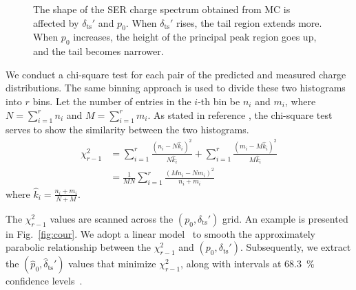 \begin{figure}[!htbp]
\begin{subfigure}{0.47\textwidth}
		\caption{}
		\label{fig:ts}
	\end{subfigure}
	\caption{The shape of the SER charge spectrum obtained from MC is affected by $\delta_{\mathrm{ts}}'$ and $p_0$. When $\delta_{\mathrm{ts}}'$ rises, the tail region extends more. When $p_0$ increases, the height of the principal peak region goes up, and the tail becomes  narrower.
	}
	\label{fig:tsp}
\end{figure}

We conduct a chi-square test for each pair of the predicted and measured charge distributions. The same binning approach is used to divide these two histograms into \(r\) bins. Let the number of entries in the \(i\)-th bin be \(n_i\) and \(m_{i}\), where \(N=\sum_{i = 1}^{r}n_{i}\) and \(M=\sum_{i = 1}^{r}m_{i}\). As stated in reference \cite{2006Comparison}, the chi-square test serves to show the similarity between the two histograms.
\begin{equation}
	\label{eq:chi}
	\begin{aligned}
		\chi^2_{r-1} & =\sum_{{i}=1}^r \frac{\left(n_{i}-N \hat{k}_{i}\right)^2}{N \hat{k}_{i}}+\sum_{{i}=1}^r\frac{\left(m_{i}-M \hat{k}_{i}\right)^2}{M \hat{k}_{i}} \\
		             & =\frac{1}{M N} \sum_{{i}=1}^r\frac{\left(M n_{i}-N m_{i}\right)^2}{n_{i}+m_{i}}
	\end{aligned}
\end{equation}
where \(\hat{k}_{i}=\frac{n_{i}+m_{i}}{N+M}\).

The \(\chi^2_{r - 1}\) values are scanned across the \((p_0,\delta_{\mathrm{ts}}')\) grid. An example is presented in Fig.~\ref{fig:cour}. We adopt a linear model~\cite{Gelman_Hill_2006} to smooth the approximately parabolic relationship between the \(\chi^2_{r - 1}\) and \((p_0, \delta_{\mathrm{ts}}')\). Subsequently, we extract the \((\hat{p}_0, \hat{\delta}_{\mathrm{ts}}')\) values that minimize \(\chi^2_{r - 1}\), along with intervals at \SI{68.3}{\percent} confidence levels~\cite{cowan1997statistical}.

